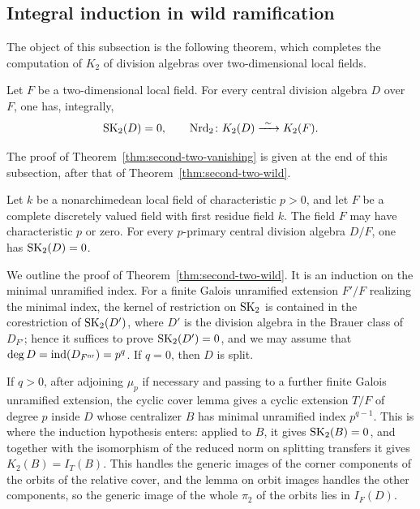 \subsection{Integral induction in wild ramification}\label{sec:second-two-wild}
The object of this subsection is the following theorem, which completes the computation of $K_2$ of division algebras over two-dimensional local fields.

\begin{theorem}\label{thm:second-two-vanishing}
Let $F$ be a two-dimensional local field.
For every central division algebra $D$ over $F$, one has, integrally,
\[
 \operatorname{SK}_2(D)=0,\qquad \operatorname{Nrd}_2\colon K_2(D)\xrightarrow{\ \sim\ }K_2(F).
\]
\end{theorem}

The proof of Theorem~\ref{thm:second-two-vanishing} is given at the end of this subsection, after that of Theorem~\ref{thm:second-two-wild}.

\begin{theorem}\label{thm:second-two-wild}
Let $k$ be a nonarchimedean local field of characteristic $p>0$, and let $F$ be a complete discretely valued field with first residue field $k$.
The field $F$ may have characteristic $p$ or zero.
For every $p$-primary central division algebra $D/F$, one has $\operatorname{SK}_2(D)=0$.
\end{theorem}

We outline the proof of Theorem~\ref{thm:second-two-wild}.
It is an induction on the minimal unramified index.
For a finite Galois unramified extension $F'/F$ realizing the minimal index, the kernel of restriction on $\operatorname{SK}_2$ is contained in the corestriction of $\operatorname{SK}_2(D')$, where $D'$ is the division algebra in the Brauer class of $D_{F'}$; hence it suffices to prove $\operatorname{SK}_2(D')=0$, and we may assume that $\deg D=\operatorname{ind}(D_{F^{\mathrm{nr}}})=p^q$.
If $q=0$, then $D$ is split.

If $q>0$, after adjoining $\mu_p$ if necessary and passing to a further finite Galois unramified extension, the cyclic cover lemma gives a cyclic extension $T/F$ of degree $p$ inside $D$ whose centralizer $B$ has minimal unramified index $p^{q-1}$.
This is where the induction hypothesis enters: applied to $B$, it gives $\operatorname{SK}_2(B)=0$, and together with the isomorphism of the reduced norm on splitting transfers it gives $K_2(B)=I_T(B)$.
This handles the generic images of the corner components of the orbits of the relative cover, and the lemma on orbit images handles the other components, so the generic image of the whole $\pi_2$ of the orbits lies in $I_F(D)$.

